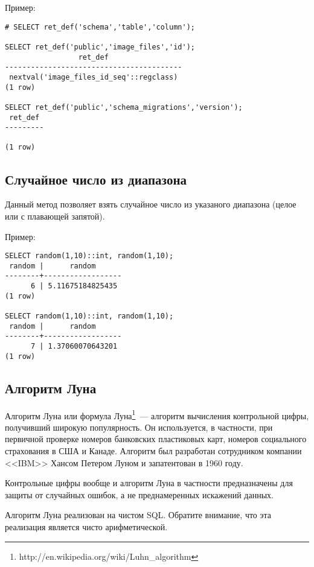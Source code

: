 Пример:
\begin{lstlisting}[label=lst:snippets7,caption=Узнать значение по умолчанию у поля в таблице. Пример]
# SELECT ret_def('schema','table','column');

SELECT ret_def('public','image_files','id');
                 ret_def
-----------------------------------------
 nextval('image_files_id_seq'::regclass)
(1 row)

SELECT ret_def('public','schema_migrations','version');
 ret_def
---------

(1 row)
\end{lstlisting}

\subsection{Случайное число из диапазона}
Данный метод позволяет взять случайное число из указаного диапазона (целое или с плавающей запятой).



Пример:
\begin{lstlisting}[label=lst:snippets9,caption=Случайное число из диапазона. Пример]
SELECT random(1,10)::int, random(1,10);
 random |      random
--------+------------------
      6 | 5.11675184825435
(1 row)

SELECT random(1,10)::int, random(1,10);
 random |      random
--------+------------------
      7 | 1.37060070643201
(1 row)
\end{lstlisting}

\subsection{Алгоритм Луна}
Алгоритм Луна или формула Луна\footnote{http://en.wikipedia.org/wiki/Luhn\_algorithm}~--- алгоритм вычисления контрольной цифры, получивший широкую популярность.
Он используется, в частности, при первичной проверке номеров банковских пластиковых карт, номеров социального
страхования в США и Канаде. Алгоритм был разработан сотрудником компании <<IBM>> Хансом Петером Луном и
запатентован в 1960 году.

Контрольные цифры вообще и алгоритм Луна в частности предназначены для защиты от случайных ошибок,
а не преднамеренных искажений данных.

Алгоритм Луна реализован на чистом SQL. Обратите внимание, что эта реализация является чисто арифметической.

